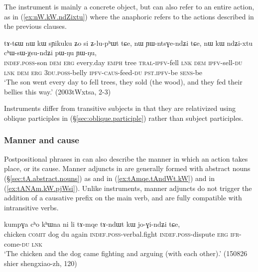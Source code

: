 The instrument is mainly a concrete object, but can also refer to an entire action, as in (\ref{ex:nW.kW.ndZixtu}) where the anaphoric  refers to the actions described in the previous clauses.

\begin{exe}
\ex \label{ex:nW.kW.ndZixtu}
 \gll tɤ-tɕɯ nɯ kɯ sɲikuku ʑo si ʑ-lu-pʰɯt tɕe, nɯ ɲɯ-ntsɣe-ndʑi tɕe,  nɯ kɯ ndʑi-xtu cʰɯ-sɯ-χsu-ndʑi pɯ-ŋu ɲɯ-ŋu,  \\
 \textsc{indef}.\textsc{poss}-son \textsc{dem} \textsc{erg} every.day \textsc{emph} tree \textsc{tral}-\textsc{ipfv}-fell \textsc{lnk} \textsc{dem} \textsc{ipfv}-sell-\textsc{du} \textsc{lnk} \textsc{dem} \textsc{erg} \textsc{3du}.\textsc{poss}-belly \textsc{ipfv}-\textsc{caus}-feed-\textsc{du} \textsc{pst}.\textsc{ipfv}-be \textsc{sens}-be \\
 \glt `The son went every day to fell trees, they sold (the wood), and they fed their bellies this way.' (2003tWxtsa, 2-3)
\end{exe}

Instruments differ from transitive subjects in that they are relativized using oblique participles in  (§\ref{sec:oblique.participle}) rather than subject participles.
 

\subsubsection{Manner and cause} \label{sec:manner.nominal.kW}
Postpositional phrases in  can also describe the manner in which an action takes place, or its cause. Manner adjuncts in  are generally formed with abstract nouns (§\ref{sec:tA.abstract.nouns}) as  and   in (\ref{ex:tAmqe.tAndWt.kW}) and  in (\ref{ex:tANAm.kW.pjWsi}). Unlike instruments, manner adjuncts do not trigger the addition of a causative prefix on the main verb, and are fully compatible with intransitive verbs.

\begin{exe}
\ex \label{ex:tAmqe.tAndWt.kW}
 \gll kumpɣa cʰo kʰɯna ni li tɤ-mqe tɤ-ndɯt kɯ jo-ɣi-ndʑi tɕe, \\
 chicken \textsc{comit} dog du again \textsc{indef}.\textsc{poss}-verbal.fight \textsc{indef}.\textsc{poss}-dispute \textsc{erg} \textsc{ifr}-come-\textsc{du} \textsc{lnk} \\
 \glt `The chicken and the dog came fighting and arguing (with each other).' (150826 shier shengxiao-zh, 120)
\end{exe}

